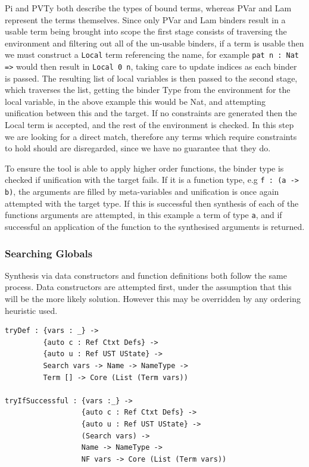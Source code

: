 \documentclass[a4paper]{article}
\begin{document}
Pi and PVTy both describe the types of bound terms, whereas PVar and
Lam represent the terms themselves. Since only PVar and Lam binders
result in a usable term being brought into scope the first stage
consists of traversing the environment and filtering out all of the
un-usable binders, if a term is usable then we must construct a
\texttt{Local} term referencing the name, for example
\texttt{pat n : Nat =>} would then result in \texttt{Local 0 n},
taking care to update indices as each
binder is passed. The resulting list of local variables is then passed to the
second stage, which traverses the list, getting the binder Type from the environment for the local variable,
in the above example this would be Nat, and attempting unification between this and the target.
If no constraints are generated then the Local term is accepted, and
the rest of the environment is checked. In this step we are looking for a direct match,
therefore any terms which require constraints to hold should are disregarded, since we have
no guarantee that they do. 

To ensure the tool is able to apply higher order functions, the binder type is checked if
unification with the target fails. If it is a function type, e.g \texttt{f : (a -> b)}, the
arguments are filled by meta-variables and unification is once again
attempted with the target type. If this is successful then synthesis of each of the functions
arguments are attempted, in this example a term of type \texttt{a},
and if successful an application of the function to the synthesised arguments is returned. 


\subsubsection{Searching Globals}
\label{sec:org8039f5d}

Synthesis via data constructors and function definitions
both follow the same process. Data constructors are attempted
first, under the assumption that this will be the more likely solution.
However this may be overridden by any ordering heuristic used.

\begin{center}
\begin{verbatim}
tryDef : {vars : _} ->
		 {auto c : Ref Ctxt Defs} -> 
		 {auto u : Ref UST UState} ->
		 Search vars -> Name -> NameType ->
		 Term [] -> Core (List (Term vars))

tryIfSuccessful : {vars :_} ->
				  {auto c : Ref Ctxt Defs} ->
				  {auto u : Ref UST UState} ->
				  (Search vars) ->
				  Name -> NameType ->
				  NF vars -> Core (List (Term vars))
\end{verbatim}
\end{center}
\end{document}
